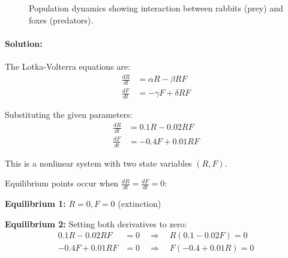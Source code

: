 \documentclass[11pt,a4paper]{article}
\begin{document}
\begin{figure}[h]
  \centering
  \caption{Population dynamics showing interaction between rabbits (prey) and foxes (predators).}
\end{figure}

\paragraph{Solution:}

The Lotka-Volterra equations are:
\begin{align}
  \frac{dR}{dt} &= \alpha R - \beta RF \\
  \frac{dF}{dt} &= -\gamma F + \delta RF
\end{align}

Substituting the given parameters:
\begin{align}
  \frac{dR}{dt} &= 0.1R - 0.02RF \\
  \frac{dF}{dt} &= -0.4F + 0.01RF
\end{align}

This is a nonlinear system with two state variables $(R, F)$.

Equilibrium points occur when $\frac{dR}{dt} = \frac{dF}{dt} = 0$:

\textbf{Equilibrium 1:} $R = 0, F = 0$ (extinction)

\textbf{Equilibrium 2:} Setting both derivatives to zero:
\begin{align}
  0.1R - 0.02RF &= 0 \quad \Rightarrow \quad R(0.1 - 0.02F) = 0 \\
  -0.4F + 0.01RF &= 0 \quad \Rightarrow \quad F(-0.4 + 0.01R) = 0
\end{align}
\end{document}
